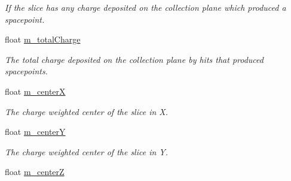 \begin{DoxyCompactItemize}
\begin{DoxyCompactList}\small\item\em If the slice has any charge deposited on the collection plane which produced a spacepoint. \end{DoxyCompactList}\item 
float \hyperlink{classflashmatch_1_1FlashMatchingTool_1_1SliceCandidate_afc0e08fdfdf5fedeb5b453b8ed73daca}{m\+\_\+total\+Charge}\hypertarget{classflashmatch_1_1FlashMatchingTool_1_1SliceCandidate_afc0e08fdfdf5fedeb5b453b8ed73daca}{}\label{classflashmatch_1_1FlashMatchingTool_1_1SliceCandidate_afc0e08fdfdf5fedeb5b453b8ed73daca}

\begin{DoxyCompactList}\small\item\em The total charge deposited on the collection plane by hits that produced spacepoints. \end{DoxyCompactList}\item 
float \hyperlink{classflashmatch_1_1FlashMatchingTool_1_1SliceCandidate_aed295480a0baeb1f6f4dfed439d2ff3a}{m\+\_\+centerX}\hypertarget{classflashmatch_1_1FlashMatchingTool_1_1SliceCandidate_aed295480a0baeb1f6f4dfed439d2ff3a}{}\label{classflashmatch_1_1FlashMatchingTool_1_1SliceCandidate_aed295480a0baeb1f6f4dfed439d2ff3a}

\begin{DoxyCompactList}\small\item\em The charge weighted center of the slice in X. \end{DoxyCompactList}\item 
float \hyperlink{classflashmatch_1_1FlashMatchingTool_1_1SliceCandidate_a6aea126f0da6c65df399de54f0014db5}{m\+\_\+centerY}\hypertarget{classflashmatch_1_1FlashMatchingTool_1_1SliceCandidate_a6aea126f0da6c65df399de54f0014db5}{}\label{classflashmatch_1_1FlashMatchingTool_1_1SliceCandidate_a6aea126f0da6c65df399de54f0014db5}

\begin{DoxyCompactList}\small\item\em The charge weighted center of the slice in Y. \end{DoxyCompactList}\item 
float \hyperlink{classflashmatch_1_1FlashMatchingTool_1_1SliceCandidate_a304e57238fd89b1d48fe0c6ae682af2a}{m\+\_\+centerZ}\hypertarget{classflashmatch_1_1FlashMatchingTool_1_1SliceCandidate_a304e57238fd89b1d48fe0c6ae682af2a}{}\label{classflashmatch_1_1FlashMatchingTool_1_1SliceCandidate_a304e57238fd89b1d48fe0c6ae682af2a}


\end{DoxyCompactItemize}
